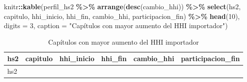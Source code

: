 \documentclass[
]{article}
\newenvironment{Shaded}{\begin{snugshade}}{\end{snugshade}}
\newcommand{\AttributeTok}[1]{\textcolor[rgb]{0.13,0.29,0.53}{#1}}
\newcommand{\DecValTok}[1]{\textcolor[rgb]{0.00,0.00,0.81}{#1}}
\newcommand{\FunctionTok}[1]{\textcolor[rgb]{0.13,0.29,0.53}{\textbf{#1}}}
\newcommand{\NormalTok}[1]{#1}
\newcommand{\SpecialCharTok}[1]{\textcolor[rgb]{0.81,0.36,0.00}{\textbf{#1}}}
\newcommand{\StringTok}[1]{\textcolor[rgb]{0.31,0.60,0.02}{#1}}
\begin{document}
\begin{Shaded}
\begin{Highlighting}[]
\NormalTok{knitr}\SpecialCharTok{::}\FunctionTok{kable}\NormalTok{(perfil\_hs2 }\SpecialCharTok{\%\textgreater{}\%} \FunctionTok{arrange}\NormalTok{(}\FunctionTok{desc}\NormalTok{(cambio\_hhi)) }\SpecialCharTok{\%\textgreater{}\%}
               \FunctionTok{select}\NormalTok{(hs2, capitulo, hhi\_inicio, hhi\_fin,}
\NormalTok{                      cambio\_hhi, participacion\_fin) }\SpecialCharTok{\%\textgreater{}\%} \FunctionTok{head}\NormalTok{(}\DecValTok{10}\NormalTok{),}
             \AttributeTok{digits =} \DecValTok{3}\NormalTok{, }\AttributeTok{caption =} \StringTok{"Capítulos con mayor aumento del HHI importador"}\NormalTok{)}
\end{Highlighting}
\end{Shaded}

\begin{longtable}[]{@{}
  >{\raggedright\arraybackslash}p{}
  >{\raggedright\arraybackslash}p{}
  >{\raggedleft\arraybackslash}p{}
  >{\raggedleft\arraybackslash}p{}
  >{\raggedleft\arraybackslash}p{}
  >{\raggedleft\arraybackslash}p{}@{}}
\caption{Capítulos con mayor aumento del HHI importador}\tabularnewline
\toprule\noalign{}
\begin{minipage}[b]{\linewidth}\raggedright
hs2
\end{minipage} & \begin{minipage}[b]{\linewidth}\raggedright
capitulo
\end{minipage} & \begin{minipage}[b]{\linewidth}\raggedleft
hhi\_inicio
\end{minipage} & \begin{minipage}[b]{\linewidth}\raggedleft
hhi\_fin
\end{minipage} & \begin{minipage}[b]{\linewidth}\raggedleft
cambio\_hhi
\end{minipage} & \begin{minipage}[b]{\linewidth}\raggedleft
participacion\_fin
\end{minipage} \\
\midrule\noalign{}
\endfirsthead
\toprule\noalign{}
\begin{minipage}[b]{\linewidth}\raggedright
hs2
\end{minipage} & \begin{minipage}[b]{\linewidth}\raggedright

\end{minipage}
\end{longtable}
\end{document}
